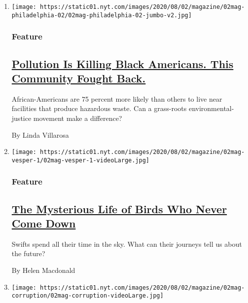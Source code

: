 \begin{enumerate}
\def\labelenumi{\arabic{enumi}.}
\item
  \texttt{[image: https://static01.nyt.com/images/2020/08/02/magazine/02mag-philadelphia-02/02mag-philadelphia-02-jumbo-v2.jpg]}

  \hypertarget{feature}{%
  \subsubsection{Feature}\label{feature}}

  \hypertarget{pollution-is-killing-black-americans-this-community-fought-back}{%
  \subsection{\texorpdfstring{\href{/2020/07/28/magazine/pollution-philadelphia-black-americans.html}{Pollution
  Is Killing Black Americans. This Community Fought
  Back.}}{Pollution Is Killing Black Americans. This Community Fought Back.}}\label{pollution-is-killing-black-americans-this-community-fought-back}}

  African-Americans are 75 percent more likely than others to live near
  facilities that produce hazardous waste. Can a grass-roots
  environmental-justice movement make a difference?

  By Linda Villarosa
\item
  \texttt{[image: https://static01.nyt.com/images/2020/08/02/magazine/02mag-vesper-1/02mag-vesper-1-videoLarge.jpg]}

  \hypertarget{feature-1}{%
  \subsubsection{Feature}\label{feature-1}}

  \hypertarget{the-mysterious-life-of-birds-who-never-come-down}{%
  \subsection{\texorpdfstring{\href{/2020/07/29/magazine/vesper-flights.html}{The
  Mysterious Life of Birds Who Never Come
  Down}}{The Mysterious Life of Birds Who Never Come Down}}\label{the-mysterious-life-of-birds-who-never-come-down}}

  Swifts spend all their time in the sky. What can their journeys tell
  us about the future?

  By Helen Macdonald
\item
  \texttt{[image: https://static01.nyt.com/images/2020/08/02/magazine/02mag-corruption/02mag-corruption-videoLarge.jpg]}


\end{enumerate}
